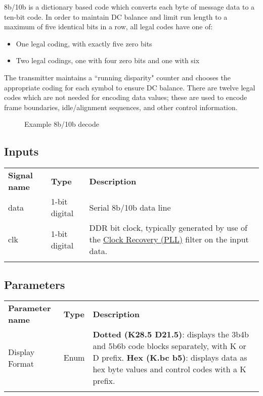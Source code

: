 8b/10b is a dictionary based code which converts each byte of message data to a ten-bit code. In order to maintain DC
balance and limit run length to a maximum of five identical bits in a row, all legal codes have one of:
\begin{itemize}
\item One legal coding, with exactly five zero bits
\item Two legal codings, one with four zero bits and one with six
\end{itemize}

The transmitter maintains a ``running disparity" counter and chooses the appropriate coding for each symbol to ensure
DC balance. There are twelve legal codes which are not needed for encoding data values; these are used to encode
frame boundaries, idle/alignment sequences, and other control information.

\begin{figure}[h]
\centering
{}
\caption{Example 8b/10b decode}
\label{filter_8b10b}
\end{figure}

\subsection{Inputs}

\begin{tabularx}{16cm}{llX}
\thickhline
\textbf{Signal name} & \textbf{Type} & \textbf{Description} \\
\thickhline
data & 1-bit digital & Serial 8b/10b data line \\
\thinhline
clk & 1-bit digital & DDR bit clock, typically generated by use of the \hyperref[filter:cdrpll]{Clock Recovery
(PLL)} filter on the input data.\\
\thickhline
\end{tabularx}

\subsection{Parameters}

\begin{tabularx}{16cm}{llX}
\thickhline
\textbf{Parameter name} & \textbf{Type} & \textbf{Description} \\
\thinhline
Display Format & Enum &
	\textbf{Dotted (K28.5 D21.5)}: displays the 3b4b and 5b6b code blocks separately, with K or D prefix. \newline
	\textbf{Hex (K.bc b5)}: displays data as hex byte values and control codes with a K prefix. \\
\thickhline
\end{tabularx}

